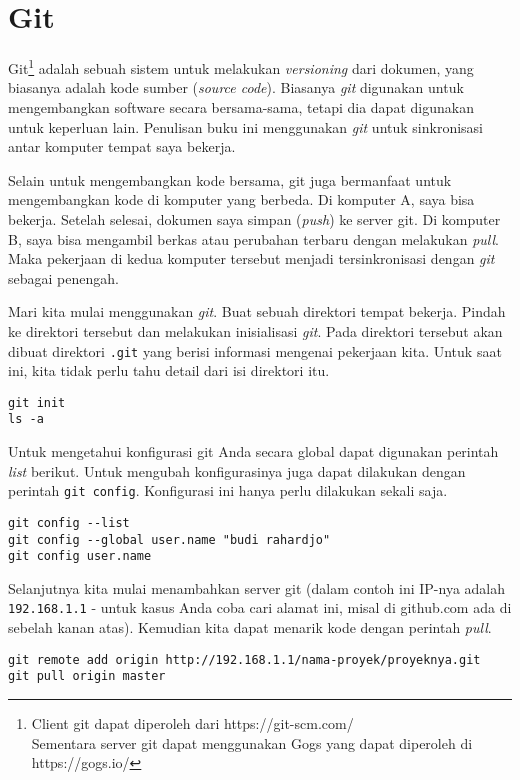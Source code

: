 \chapter{Git}
Git\footnote{Client git dapat diperoleh dari https://git-scm.com/\\
Sementara server git dapat menggunakan Gogs yang dapat diperoleh di
https://gogs.io/}
adalah sebuah sistem untuk melakukan {\em versioning} dari dokumen,
yang biasanya adalah kode sumber ({\em source code}).
Biasanya {\em git} digunakan untuk mengembangkan software secara bersama-sama,
tetapi dia dapat digunakan untuk keperluan lain.
Penulisan buku ini menggunakan {\em git} untuk sinkronisasi
antar komputer tempat saya bekerja.

Selain untuk mengembangkan kode bersama, git juga bermanfaat untuk
mengembangkan kode di komputer yang berbeda.
Di komputer A, saya bisa bekerja. Setelah selesai, dokumen saya
simpan ({\em push}) ke server git. 
Di komputer B, saya bisa mengambil berkas atau perubahan terbaru
dengan melakukan {\em pull}. Maka pekerjaan di kedua komputer tersebut
menjadi tersinkronisasi dengan {\em git} sebagai penengah.

Mari kita mulai menggunakan {\em git}.
Buat sebuah direktori tempat bekerja. Pindah ke direktori tersebut dan
melakukan inisialisasi {\em git}. 
Pada direktori tersebut akan dibuat direktori \texttt{.git}
yang berisi informasi mengenai pekerjaan kita. 
Untuk saat ini, kita tidak perlu tahu detail dari isi direktori itu.

\begin{lstlisting}
git init
ls -a
\end{lstlisting}

Untuk mengetahui konfigurasi git Anda secara global dapat digunakan
perintah {\em list} berikut. Untuk mengubah konfigurasinya juga dapat
dilakukan dengan perintah \texttt{git config}.
Konfigurasi ini hanya perlu dilakukan sekali saja.
\begin{lstlisting}
git config --list
git config --global user.name "budi rahardjo"
git config user.name
\end{lstlisting}

Selanjutnya kita mulai menambahkan server git (dalam contoh ini
IP-nya adalah \texttt{192.168.1.1} - untuk kasus Anda coba cari alamat ini,
misal di github.com ada di sebelah kanan atas).
Kemudian kita dapat menarik kode dengan perintah {\em pull}.

\begin{lstlisting}
git remote add origin http://192.168.1.1/nama-proyek/proyeknya.git
git pull origin master
\end{lstlisting}

